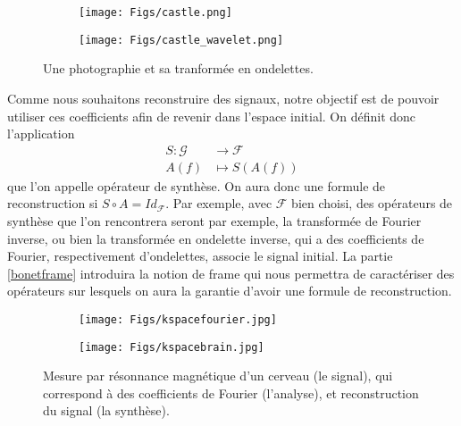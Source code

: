 \begin{figure}[h]%
\centering
\begin{subfigure}{.5\textwidth}
  \centering
  \texttt{[image: Figs/castle.png]}
  \label{fig:sub1}
\end{subfigure}%
\begin{subfigure}{.5\textwidth}
  \centering
  \texttt{[image: Figs/castle\_wavelet.png]}
  \label{fig:sub2}
\end{subfigure}
\caption{Une photographie et sa tranformée en ondelettes.}
\label{fig:test}
\end{figure}
Comme nous souhaitons reconstruire des signaux, notre objectif est de pouvoir utiliser ces coefficients afin de revenir dans l'espace initial.
On définit donc l'application
\begin{align}
	S : \mathcal{G} &\longrightarrow \mathcal{F}\\
		A(f) &\longmapsto S(A(f))
\end{align}
que l'on appelle opérateur de synthèse.
\newline
On aura donc une formule de reconstruction si $S \circ A = Id_{\mathcal{F}}$.
Par exemple, avec $\mathcal{F}$ bien choisi, des opérateurs de synthèse que l'on rencontrera seront par exemple, la transformée de Fourier inverse, ou bien la transformée en ondelette inverse, qui a des coefficients de Fourier, respectivement d'ondelettes, associe le signal initial.
La partie \ref{bonetframe} introduira la notion de frame qui nous permettra de caractériser des opérateurs sur lesquels on aura la garantie d'avoir une formule de reconstruction.

\begin{figure}[h]%
\centering
\begin{subfigure}{.5\textwidth}
  \centering
  \texttt{[image: Figs/kspacefourier.jpg]}
  \label{fig:sub1}
\end{subfigure}%
\begin{subfigure}{.5\textwidth}
  \centering
  \texttt{[image: Figs/kspacebrain.jpg]}
  \label{fig:sub2}
\end{subfigure}
	\caption{Mesure par résonnance magnétique d'un cerveau (le signal), qui correspond à des coefficients de Fourier (l'analyse), et reconstruction du signal (la synthèse).}
\label{fig:test}
\end{figure}


